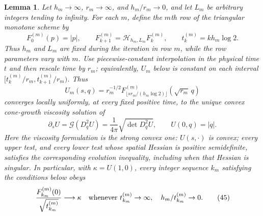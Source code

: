 \documentclass{aomart}
\newtheorem{lemma}[theorem]{Lemma}
\theoremstyle{definition}
\newcommand{\1}{\mathbf 1}
\begin{document}
\begin{lemma}\label{lem:viscosity-limit}
Let $h_ m\to\infty$, $r_ m\to\infty$, and $h_ m/r_ m\to0$, and let
$L_ m$ be arbitrary integers tending to infinity.  For each $m$, define the
$m$th row of the triangular monotone scheme by
\begin{equation}
F_0^{(m)}(p)=|p|,\qquad
F_{k+1}^{(m)}=\mathcal H_{h_m,L_m}F_k^{(m)},
\qquad t_k^{(m)}=k h_m\log2.
\tag{42}
\end{equation}
Thus $h_m$ and $L_m$ are fixed during the iteration in row $m$, while the
row parameters vary with $m$.  Use piecewise-constant interpolation in the
physical time $t$ and then rescale time by $r_m$; equivalently, $U_m$ below is
constant on each interval
$[t_k^{(m)}/r_m,t_{k+1}^{(m)}/r_m)$.  Thus
\begin{equation}
U_ m(s,q)=r_ m^{-1/2}F_{\lfloor sr_ m/(h_ m\log2)\rfloor}^{(m)}
(\sqrt{r_ m}\,q)
\tag{43}
\end{equation}
converges locally uniformly, at every fixed positive time, to the unique
convex cone-growth viscosity solution of
\begin{equation}
\partial_ sU=\mathcal G(D_ q^2U)=\frac1{4\pi}\sqrt{\det D_ q^2U},
\qquad U(0,q)=|q|.
\tag{44}
\end{equation}
Here the viscosity formulation is the strong convex one:
$U(s,\cdot)$ is convex; every upper test, and every lower test whose
spatial Hessian is positive semidefinite, satisfies the corresponding
evolution inequality, including when that Hessian is singular.  In
particular, with $\kappa=U(1,0)$, every integer sequence $k_m$ satisfying
the conditions below obeys
\begin{equation}
\frac{F_{k_m}^{(m)}(0)}{\sqrt{t_{k_m}^{(m)}}}\longrightarrow\kappa
\quad\hbox{whenever }t_{k_m}^{(m)}\to\infty,
\quad h_m/t_{k_m}^{(m)}\to0.
\tag{45}
\end{equation}

\end{lemma}
\end{document}
